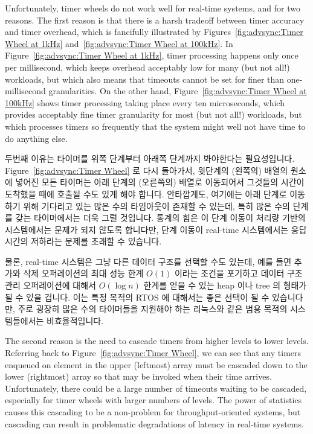 Unfortunately, timer wheels do not work well for real-time systems, and for
two reasons.
The first reason is that there is a harsh tradeoff between timer
accuracy and timer overhead, which is fancifully illustrated by
Figures~\ref{fig:advsync:Timer Wheel at 1kHz}
and~\ref{fig:advsync:Timer Wheel at 100kHz}.
In
Figure~\ref{fig:advsync:Timer Wheel at 1kHz},
timer processing happens only once per millisecond, which keeps overhead
acceptably low for many (but not all!) workloads, but which also means
that timeouts cannot be set for finer than one-millisecond granularities.
On the other hand,
Figure~\ref{fig:advsync:Timer Wheel at 100kHz}
shows timer processing taking place every ten microseconds, which
provides acceptably fine timer granularity for most (but not all!)
workloads, but which processes timers so frequently that the system
might well not have time to do anything else.
\fi

두번째 이유는 타이머를 위쪽 단계부터 아래쪽 단계까지 봐야한다는 필요성입니다.
Figure~\ref{fig:advsync:Timer Wheel} 로 다시 돌아가서, 윗단계의 (왼쪽의) 배열의
 원소에 넣어진 모든 타이머는 아래 단계의 (오른쪽의) 배열로 이동되어서
그것들의 시간이 도착했을 때에 호출될 수도 있게 해야 합니다.
안타깝게도, 여기에는 아래 단계로 이동하기 위해 기다리고 있는 많은 수의
타임아웃이 존재할 수 있는데, 특히 많은 수의 단계를 갖는 타이머에서는 더욱 그럴
것입니다.
통계의 힘은 이 단계 이동이 처리량 기반의 시스템에서는 문제가 되지 않도록
합니다만, 단계 이동이 real-time 시스템에서는 응답시간의 저하라는 문제를 초래할
수 있습니다.

물론, real-time 시스템은 그냥 다른 데이터 구조를 선택할 수도 있는데, 예를 들면
추가와 삭제 오퍼레이션의 최대 성능 한계 $O(1)$ 이라는 조건을 포기하고 데이터
구조 관리 오퍼레이션에 대해서 $O(\log n)$ 한계를 얻을 수 있는 heap 이나 tree 의
형태가 될 수 있을 겁니다.
이는 특정 목적의 RTOS 에 대해서는 좋은 선택이 될 수 있습니다만, 주로 굉장히
많은 수의 타이머들을 지원해야 하는 리눅스와 같은 범용 목적의 시스템들에서는
비효율적입니다.
\iffalse

The second reason is the need to cascade timers from higher levels to
lower levels.
Referring back to
Figure~\ref{fig:advsync:Timer Wheel},
we can see that any timers enqueued on element  in the upper
(leftmost) array must be cascaded down to the lower (rightmost)
array so that may be invoked when their time arrives.
Unfortunately, there could be a large number of timeouts
waiting to be cascaded, especially for timer wheels with larger numbers
of levels.
The power of statistics causes this cascading to be a non-problem for
throughput-oriented systems, but cascading can result in problematic
degradations of latency in real-time systems.

